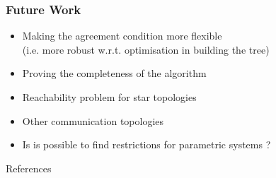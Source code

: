 \documentclass{beamer}
\theoremstyle{remark}
\theoremstyle{definition}
\begin{document}
\begin{frame} 
  \frametitle{Future Work}
  \begin{itemize}
  \item Making the agreement condition more flexible\\ (i.e. more robust w.r.t. optimisation in building the tree)
  \item Proving the completeness of the algorithm
  \item Reachability problem for star topologies
  \item Other communication topologies
  \item Is is possible to find restrictions for parametric systems ?
  \end{itemize}
\end{frame} 

\begin{frame}[allowframebreaks]{References}
  \frametitle{}
  {\tiny
  
  
  }
\end{frame}
\end{document}
